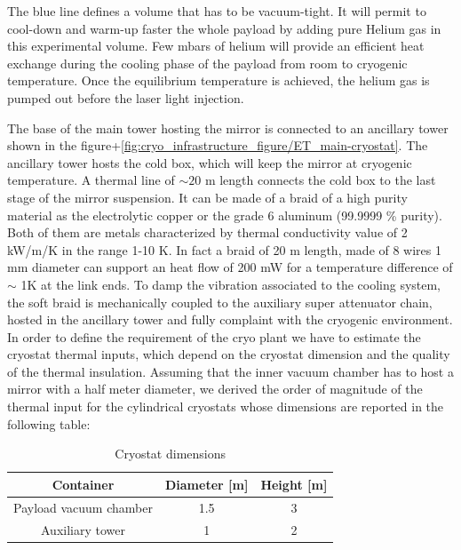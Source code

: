 The blue line defines a volume that has to be vacuum-tight. It will permit to cool-down and warm-up faster the whole payload by adding pure Helium gas in this experimental volume. 
Few mbars of helium will provide an efficient heat exchange during the cooling phase of the payload from room to cryogenic temperature. Once the equilibrium temperature is achieved, the helium gas is pumped out before the laser light injection. 

The base of the main tower hosting the mirror is connected to an ancillary tower shown in the figure+\ref{fig:cryo_infrastructure_figure/ET_main-cryostat}. The ancillary tower  hosts the cold box, which will keep the mirror at cryogenic temperature. 
A thermal line of $\sim 20$ m length connects the cold box to the last stage of the mirror suspension. It can be made of a braid of a high purity material as the electrolytic copper or the grade 6 aluminum (99.9999 \% purity). Both of them are metals characterized by thermal conductivity value of 2 kW/m/K in the range 1-10 K. In fact a braid of 20 m length, made of 8 wires 1 mm diameter can support an heat flow of 200 mW for a temperature difference of$\sim$ 1K at the link ends. To damp the vibration associated to the cooling system, the soft braid is mechanically coupled to the auxiliary super attenuator chain, hosted in the ancillary tower and fully complaint with the cryogenic environment. In order to define the requirement of the cryo plant we have to estimate the cryostat thermal inputs, which depend on the cryostat dimension and the quality of the thermal insulation. \noindent Assuming that the inner vacuum chamber has to host a mirror with a half meter diameter, we derived the order of magnitude of the thermal input for the cylindrical cryostats whose dimensions are reported in the following table: 
\begin{table}[htp] 
\caption{Cryostat dimensions} 
\begin{center} 
\begin{tabular}{|c|c|c|} \hline \hline Container & Diameter [m] & Height [m]\\ \hline Payload vacuum chamber & 1.5 & 3 \\ Auxiliary tower & 1 & 2 \\ \hline \hline
\end{tabular} 
\end{center} 
\label{tab:cryostat_dimension} 
\end{table} 

